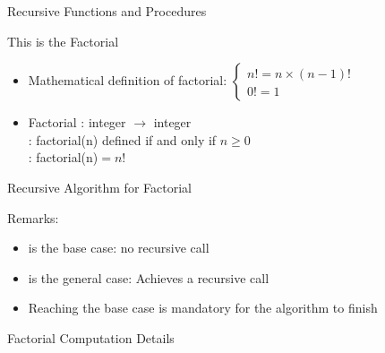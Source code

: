 \begin{Coupe}
\begin{frame}{Recursive Functions and Procedures}
  \begin{block}{This is the Factorial}
    \begin{itemize}
    \item Mathematical definition of factorial:
      $\left\{
        \begin{array}{l}
          n! = n \times (n-1)! \\
          0! = 1
        \end{array}\right.$
      
      \item Factorial : integer $\rightarrow$ integer\\
        : factorial(n) defined if and only if $n\geq 0$\\
        : factorial(n)$=n!$
    \end{itemize}
  \end{block}
\end{frame}
\begin{frame}{Recursive Algorithm for Factorial}
  \bigskip\bigskip

  \centerline{}

\bigskip
\bigskip
Remarks:
\begin{itemize}
\item {} is the \alert{base case}: no recursive call
\item {} is the \alert{general
    case}: Achieves a recursive call
\item Reaching the base case is mandatory for the algorithm to finish
\end{itemize}

\end{frame}
\begin{frame}{Factorial Computation Details}
  

\end{frame}
\end{Coupe}
